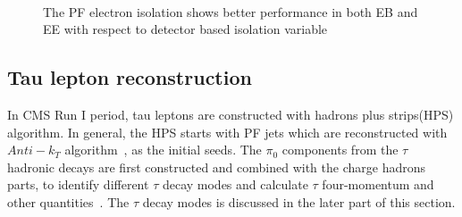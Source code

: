 \begin{figure}[!htbp] 
     \centering
     \\
     \caption{The PF electron isolation shows better performance in both EB and EE with respect to detector based isolation variable~\cite{electron_reco2015}}
     \label{fig:eleIso}
\end{figure}




\subsection{Tau lepton reconstruction} \label{Chapter:taureco}

In CMS Run I period, tau leptons are constructed with hadrons plus strips(HPS) algorithm. In general, the HPS starts with PF jets which are reconstructed with $Anti-k_{T}$ algorithm~\cite{Cacciari:2008gp}, as the initial seeds. The $\pi_{0}$ components from the $\tau$ hadronic decays are first constructed and combined with the charge hadrons parts, to identify different $\tau$ decay modes and calculate $\tau$ four-momentum and other quantities~\cite{TauIdentiRunI}. The $\tau$ decay modes is discussed in the later part of this section.


